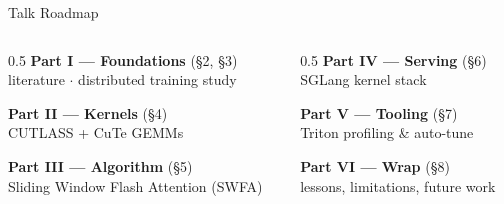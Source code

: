 \documentclass[10pt,aspectratio=169]{beamer}
\begin{document}
\begin{frame}{Talk Roadmap}
  \begin{columns}[T]
    \begin{column}{0.5\textwidth}
      \textbf{Part I — Foundations} \hfill (\S2, \S3)\\[0.5ex]
      \footnotesize literature $\cdot$ distributed training study
      \vspace{2ex}

      \textbf{Part II — Kernels} \hfill (\S4)\\[0.5ex]
      \footnotesize CUTLASS + CuTe GEMMs
      \vspace{2ex}

      \textbf{Part III — Algorithm} \hfill (\S5)\\[0.5ex]
      \footnotesize \alert{Sliding Window Flash Attention (SWFA)}
    \end{column}
    \begin{column}{0.5\textwidth}
      \textbf{Part IV — Serving} \hfill (\S6)\\[0.5ex]
      \footnotesize SGLang kernel stack
      \vspace{2ex}

      \textbf{Part V — Tooling} \hfill (\S7)\\[0.5ex]
      \footnotesize Triton profiling \& auto-tune
      \vspace{2ex}

      \textbf{Part VI — Wrap} \hfill (\S8)\\[0.5ex]
      \footnotesize lessons, limitations, future work
    \end{column}
  \end{columns}
\end{frame}

\end{document}

